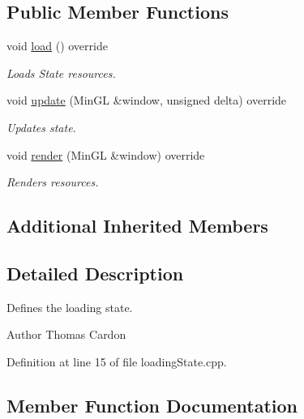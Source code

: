 \subsection*{Public Member Functions}
\begin{DoxyCompactItemize}
\item 
void \hyperlink{class_loading_state_a66c29bb02cb85fbc522040dc23739118}{load} () override
\begin{DoxyCompactList}\small\item\em Loads State resources. \end{DoxyCompactList}\item 
void \hyperlink{class_loading_state_a2c84aeaac65724696a6cacd6474119bf}{update} (Min\+GL \&window, unsigned delta) override
\begin{DoxyCompactList}\small\item\em Updates state. \end{DoxyCompactList}\item 
void \hyperlink{class_loading_state_a64812e3f15d84b60ab8313509ba07520}{render} (Min\+GL \&window) override
\begin{DoxyCompactList}\small\item\em Renders resources. \end{DoxyCompactList}\end{DoxyCompactItemize}
\subsection*{Additional Inherited Members}


\subsection{Detailed Description}
Defines the loading state. 

\begin{DoxyAuthor}{Author}
Thomas Cardon 
\end{DoxyAuthor}


Definition at line 15 of file loading\+State.\+cpp.



\subsection{Member Function Documentation}
\mbox{\label{class_loading_state_a66c29bb02cb85fbc522040dc23739118}} 
